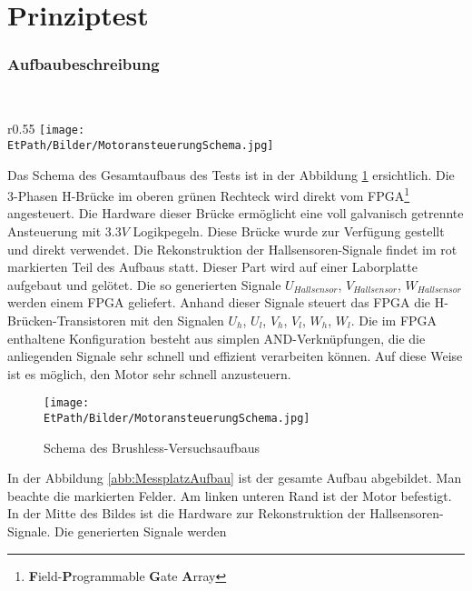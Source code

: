 \ifSTANDALONE
\section{Prinziptest}
\fi
\ifEMBED
\subsubsection{Aufbaubeschreibung}
\label{chap:BrushlessAufbaubeschreibung}
    \BLDCcollab \\
\fi
\ifEMBED
    \begin{wrapfigure}{r}{0.55\textwidth}
       	\texttt{[image: \\EtPath/Bilder/MotoransteuerungSchema.jpg]}
       	\centering
       	\caption{Schema des Brushless-Versuchsaufbaus}
        \label{abb:MotoransteuerungSchema}
    \end{wrapfigure}
\fi
    Das Schema des Gesamtaufbaus des Tests ist in der Abbildung 
    \ref{abb:MotoransteuerungSchema} ersichtlich. Die 3-Phasen H-Brücke im 
    oberen grünen Rechteck wird direkt vom FPGA\footnote
    {\textbf{F}ield-\textbf{P}rogrammable \textbf{G}ate 
    \textbf{A}rray} angesteuert. Die Hardware dieser Brücke ermöglicht eine 
    voll galvanisch getrennte Ansteuerung mit $3.3 V$ Logikpegeln. Diese 
    Brücke wurde zur Verfügung gestellt und direkt verwendet. Die 
    Rekonstruktion der Hallsensoren-Signale findet im rot markierten Teil des 
    Aufbaus statt. Dieser Part wird auf einer Laborplatte aufgebaut und 
    gelötet. Die so generierten Signale $U_{Hallsensor}$, $V_{Hallsensor}$, 
    $W_{Hallsensor}$ werden einem FPGA geliefert. Anhand dieser Signale 
    steuert das FPGA die H-Brücken-Transistoren mit den Signalen $U_h$, $U_l$, 
    $V_h$, $V_l$, $W_h$, $W_l$. Die im FPGA enthaltene Konfiguration besteht 
    aus simplen AND-Verknüpfungen, die die anliegenden Signale sehr schnell 
    und effizient verarbeiten können. Auf diese Weise ist es möglich, den 
    Motor sehr schnell anzusteuern.
    \ifSTANDALONE
    \begin{figure}[h!]
    	\texttt{[image: \\EtPath/Bilder/MotoransteuerungSchema.jpg]}
       	\centering
       	\caption{Schema des Brushless-Versuchsaufbaus}
        \label{abb:MotoransteuerungSchema}
    \end{figure}
    \fi
    In der Abbildung \ref{abb:MessplatzAufbau} ist der gesamte Aufbau 
    abgebildet. Man beachte die markierten Felder. Am linken unteren Rand ist 
    der Motor befestigt. In der Mitte des Bildes ist die Hardware zur 
    Rekonstruktion der Hallsensoren-Signale.  Die generierten Signale werden 
